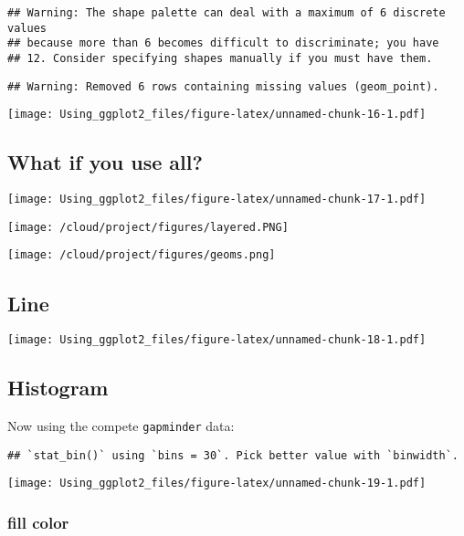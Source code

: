 \documentclass[]{article}
\begin{document}
\begin{verbatim}
## Warning: The shape palette can deal with a maximum of 6 discrete values
## because more than 6 becomes difficult to discriminate; you have
## 12. Consider specifying shapes manually if you must have them.
\end{verbatim}

\begin{verbatim}
## Warning: Removed 6 rows containing missing values (geom_point).
\end{verbatim}

\texttt{[image: Using\_ggplot2\_files/figure-latex/unnamed-chunk-16-1.pdf]}

\hypertarget{what-if-you-use-all}{%
\subsection{What if you use all?}\label{what-if-you-use-all}}

\texttt{[image: Using\_ggplot2\_files/figure-latex/unnamed-chunk-17-1.pdf]}

\texttt{[image: /cloud/project/figures/layered.PNG]}

\texttt{[image: /cloud/project/figures/geoms.png]}

\hypertarget{line}{%
\subsection{Line}\label{line}}

\texttt{[image: Using\_ggplot2\_files/figure-latex/unnamed-chunk-18-1.pdf]}

\hypertarget{histogram}{%
\subsection{Histogram}\label{histogram}}

Now using the compete \texttt{gapminder} data:

\begin{verbatim}
## `stat_bin()` using `bins = 30`. Pick better value with `binwidth`.
\end{verbatim}

\texttt{[image: Using\_ggplot2\_files/figure-latex/unnamed-chunk-19-1.pdf]}

\hypertarget{fill-color}{%
\subsubsection{fill color}\label{fill-color}}
\end{document}
